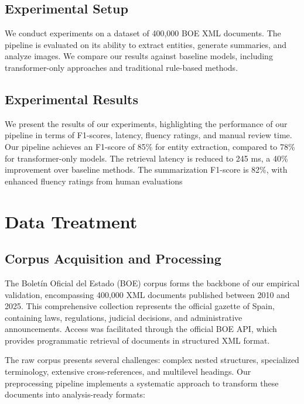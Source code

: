 \documentclass[conference]{IEEEtran}
\begin{document}
\subsection{Experimental Setup}
We conduct experiments on a dataset of 400,000 BOE XML documents. The pipeline is evaluated on its ability to extract entities, generate summaries, and analyze images. We compare our results against baseline models, including transformer-only approaches and traditional rule-based methods.
\subsection{Experimental Results}
We present the results of our experiments, highlighting the performance of our pipeline in terms of F1-scores, latency, fluency ratings, and manual review time. Our pipeline achieves an F1-score of 85\% for entity extraction, compared to 78\% for transformer-only models. The retrieval latency is reduced to 245 ms, a 40\% improvement over baseline methods. The summarization F1-score is 82\%, with enhanced fluency ratings from human evaluations

\section{Data Treatment}
\subsection{Corpus Acquisition and Processing}
The Boletín Oficial del Estado (BOE) corpus forms the backbone of our empirical validation, encompassing 400,000 XML documents published between 2010 and 2025. This comprehensive collection represents the official gazette of Spain, containing laws, regulations, judicial decisions, and administrative announcements. Access was facilitated through the official BOE API, which provides programmatic retrieval of documents in structured XML format.

The raw corpus presents several challenges: complex nested structures, specialized terminology, extensive cross-references, and multilevel headings. Our preprocessing pipeline implements a systematic approach to transform these documents into analysis-ready formats:
\end{document}

